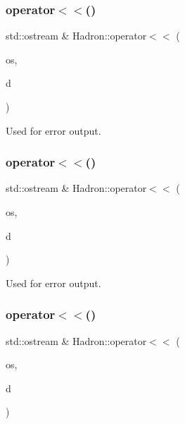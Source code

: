 \subsubsection{\texorpdfstring{operator$<$$<$()}{operator<<()}\hspace{0.1cm}{\footnotesize\ttfamily [20/48]}}
{\footnotesize\ttfamily std\+::ostream \& Hadron\+::operator$<$$<$ (\begin{DoxyParamCaption}\item[{std\+::ostream \&}]{os,  }\item[{const \mbox{\hyperlink{structHadron_1_1KeyBaryonElementalOperator__t}{Key\+Baryon\+Elemental\+Operator\+\_\+t}} \&}]{d }\end{DoxyParamCaption})}



Used for error output. 

\mbox{\label{namespaceHadron_a42b0be53de314a1cf2c05e7d4d4a34d9}} 
\subsubsection{\texorpdfstring{operator$<$$<$()}{operator<<()}\hspace{0.1cm}{\footnotesize\ttfamily [21/48]}}
{\footnotesize\ttfamily std\+::ostream \& Hadron\+::operator$<$$<$ (\begin{DoxyParamCaption}\item[{std\+::ostream \&}]{os,  }\item[{const \mbox{\hyperlink{structHadron_1_1KeyPeramDist__t}{Key\+Peram\+Dist\+\_\+t}} \&}]{d }\end{DoxyParamCaption})}



Used for error output. 

\mbox{\label{namespaceHadron_a8fafc13cc7955fdf6c70c8c72c7b0000}} 
\subsubsection{\texorpdfstring{operator$<$$<$()}{operator<<()}\hspace{0.1cm}{\footnotesize\ttfamily [22/48]}}
{\footnotesize\ttfamily std\+::ostream \& Hadron\+::operator$<$$<$ (\begin{DoxyParamCaption}\item[{std\+::ostream \&}]{os,  }\item[{const \mbox{\hyperlink{structHadron_1_1KeyPropElementalOperator__t}{Key\+Prop\+Elemental\+Operator\+\_\+t}} \&}]{d }\end{DoxyParamCaption})}



